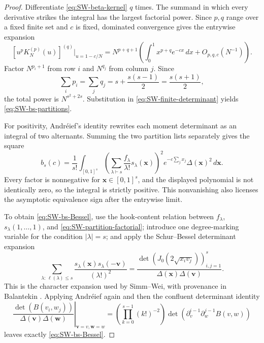 \begin{proof}
Differentiate \eqref{eq:SW-beta-kernel} $q$ times.  The summand in which every derivative
strikes the integral has the largest factorial power.  Since $p,q$ range over a fixed finite
set and $c$ is fixed, dominated convergence gives the entrywise expansion
\begin{equation}
 \left[u^pK_N^{(p)}(u)\right]^{(q)}\Big|_{u=1-c/N}
 =N^{p+q+1}\left(\int_0^1x^{p+q}e^{-cx}\,dx+O_{p,q,c}(N^{-1})\right).
 \label{eq:SW-entry-microscopic}
\end{equation}
Factor $N^{p_i+1}$ from row $i$ and $N^{q_j}$ from column $j$.  Since
\begin{equation}
 \sum_i p_i=\sum_jq_j=s+\frac{s(s-1)}2=\frac{s(s+1)}2,
\end{equation}
the total power is $N^{s^2+2s}$.  Substitution in
\eqref{eq:SW-finite-determinant} yields \eqref{eq:SW-bs-partitions}.

For positivity, Andr\'eief's identity rewrites each moment determinant as an integral of two
alternants.  Summing the two partition lists separately gives the square
\begin{equation}
 b_s(c)=\frac1{s!}\int_{[0,1]^s}
 \left(\sum_{\lambda\vdash s}\frac{f_\lambda}{\lambda!}
 s_\lambda(\mathbf x)\right)^2
 e^{-c\sum_jx_j}\Delta(\mathbf x)^2\,d\mathbf x.
 \label{eq:SW-bs-positive}
\end{equation}
Every factor is nonnegative for $\mathbf x\in[0,1]^s$, and the displayed polynomial is not
identically zero, so the integral is strictly positive.  This nonvanishing also licenses the
asymptotic equivalence sign after the entrywise limit.

To obtain \eqref{eq:SW-bs-Bessel}, use the hook-content relation between
$f_\lambda$, $s_\lambda(1,\ldots,1)$, and \eqref{eq:SW-partition-factorial}; introduce one
degree-marking variable for the condition $|\lambda|=s$; and apply the Schur--Bessel
determinant expansion
\begin{equation}
 \sum_{\lambda:\,\ell(\lambda)\leq s}
 \frac{s_\lambda(\mathbf x)s_\lambda(-\mathbf v)}{(\lambda!)^2}
 =\frac{\det(J_0(2\sqrt{x_iv_j}))_{i,j=1}^{s}}
 {\Delta(\mathbf x)\Delta(\mathbf v)}.
 \label{eq:SW-Schur-Bessel}
\end{equation}
This is the character expansion used by Simm--Wei, with provenance in Balantekin
\cite[App.~B]{balantekin2000}.  Applying Andr\'eief again and then the confluent determinant
identity
\begin{equation}
 \left.\frac{\det(B(v_i,w_j))}{\Delta(\mathbf v)\Delta(\mathbf w)}
 \right|_{\mathbf v=v,\mathbf w=w}
 =\left(\prod_{k=0}^{s-1}(k!)^{-2}\right)
 \det(\partial_v^{i-1}\partial_w^{j-1}B(v,w))
 \label{eq:SW-confluent-two-list}
\end{equation}
leaves exactly \eqref{eq:SW-bs-Bessel}.
\end{proof}

